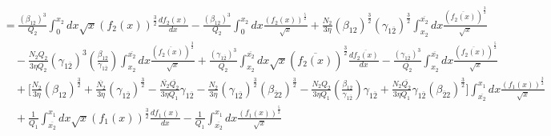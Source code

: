 \documentclass[fleqn, 10pt]{article}
\begin{document}
 \begin{equation*}
 \begin{split}
     &= \frac{(\beta_{12})^3}{Q_2} \int^{x_2}_0 dx \sqrt{x} (f_2(x))^\frac{3}{2} \frac{df_2(x)}{dx} - \frac{(\beta_{12})^3}{Q_2} \int^{x_2}_0 dx \frac{(f_2(x))^\frac{5}{2}}{\sqrt{x}} + \frac{N_2}{3 \eta} (\beta_{12})^\frac{3}{2} (\gamma_{1\overline{2}})^\frac{3}{2} \int^{\overline{x_{2}}}_{x_2} dx \frac{(\overline{f_{2}(x)})^\frac{3}{2}}{\sqrt{x}} \\ & \quad - \frac{N_2 Q_2}{3 \eta \overline{Q_{2}}} (\gamma_{1\overline{2}})^3 \left( \frac{\beta_{12}}{\gamma_{1\overline{2}}}\right) \int^{\overline{x_{2}}}_{x_2} dx \frac{(\overline{f_{2}(x)})^\frac{3}{2}}{\sqrt{x}} + \frac{(\gamma_{1\overline{2}})^3}{\overline{Q_{2}}} \int^{\overline{x_{2}}}_{x_2} dx \sqrt{x} (\overline{f_{2}(x)})^\frac{3}{2} \frac{d\overline{f_{2}(x)}}{dx} - \frac{(\gamma_{1\overline{2}})^3}{\overline{Q_{2}}} \int^{\overline{x_{2}}}_{x_2} dx \frac{(\overline{f_{2}(x)})^\frac{5}{2}}{\sqrt{x}} \\ & \quad + \Biggl[ \frac{N_2}{3 \eta} (\beta_{12})^\frac{3}{2} + \frac{\overline{N_{2}}}{3 \eta} (\gamma_{1\overline{2}})^\frac{3}{2} - \frac{\overline{N_{2}} \overline{Q_{2}}}{3 \eta Q_1} \gamma_{1\overline{2}} - \frac{N_2}{3 \eta} (\gamma_{1\overline{2}})^\frac{3}{2} (\beta_{\overline{2}2})^\frac{3}{2} - \frac{N_2 Q_2}{3 \eta Q_1} \left( \frac{\beta_{12}}{\gamma_{1\overline{2}}}\right) \gamma_{1\overline{2}} + \frac{N_2 \overline{Q_{2}}}{3 \eta Q_1} \gamma_{1\overline{2}} (\beta_{\overline{2}2})^\frac{3}{2} \Biggr] \int^{x_1}_{\overline{x_{2}}} dx \frac{(f_1(x))^\frac{3}{2}}{\sqrt{x}} \\ & \quad + \frac{1}{Q_1} \int^{x_1}_{\overline{x_{2}}} dx \sqrt{x} (f_1(x))^\frac{3}{2} \frac{df_1(x)}{dx} - \frac{1}{Q_1} \int^{x_1}_{\overline{x_{2}}} dx \frac{(f_1(x))^\frac{5}{2}}{\sqrt{x}}
     \end{split}
 \end{equation*} 
\end{document}
